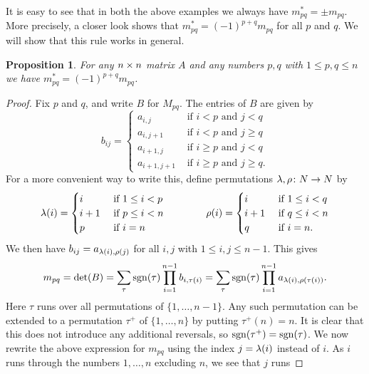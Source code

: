 \documentclass[reqno]{amsart}
\newtheorem{proposition}[theorem]{Proposition}
\theoremstyle{definition}
\begin{document}
It is easy to see that in both the above examples we always have
$m^*_{pq}=\pm m_{pq}$.  More precisely, a closer look shows that
$m^*_{pq}=(-1)^{p+q}m_{pq}$ for all $p$ and $q$.  We will show that
this rule works in general.

\begin{proposition}\label{prop-minors}
 For any $n\times n$ matrix $A$ and any numbers $p,q$ with
 $1\leq p,q\leq n$ we have $m^*_{pq}=(-1)^{p+q}m_{pq}$.
\end{proposition}
\begin{proof}
 Fix $p$ and $q$, and write $B$ for $M_{pq}$.  The entries of
 $B$ are given by
 \[ b_{ij} =
     \begin{cases}
      a_{i,j}     & \text{ if } i<p \text{ and } j < q \\
      a_{i,j+1}   & \text{ if } i<p \text{ and } j \geq q \\
      a_{i+1,j}   & \text{ if } i\geq p \text{ and } j < q \\
      a_{i+1,j+1} & \text{ if } i\geq p \text{ and } j \geq q.
     \end{cases}
 \]
 For a more convenient way to write this, define permutations
 $\lambda,\rho\colon N\to N$ by
 \[ \lambda(i) = \begin{cases}
      i   & \text{ if } 1\leq i<p \\
      i+1 & \text{ if } p\leq i<n \\
      p   & \text{ if } i=n
     \end{cases}
     \hspace{4em}
    \rho(i) = \begin{cases}
      i   & \text{ if } 1\leq i<q \\
      i+1 & \text{ if } q\leq i<n \\
      q   & \text{ if } i=n.
     \end{cases}
 \]
 We then have $b_{ij}=a_{\lambda(i),\rho(j)}$ for all $i,j$ with
 $1\leq i,j\leq n-1$.  This gives
 \[ m_{pq} = \det(B)
     = \sum_\tau \operatorname{sgn}(\tau)\prod_{i=1}^{n-1}b_{i,\tau(i)}
     = \sum_\tau \operatorname{sgn}(\tau)\prod_{i=1}^{n-1}a_{\lambda(i),\rho(\tau(i))}.
 \]
 Here $\tau$ runs over all permutations of $\{1,\dotsc,n-1\}$.  Any
 such permutation can be extended to a permutation $\tau^+$ of
 $\{1,\dotsc,n\}$ by putting $\tau^+(n)=n$.  It is clear that this
 does not introduce any additional reversals, so
 $\operatorname{sgn}(\tau^+)=\operatorname{sgn}(\tau)$.  We now rewrite the above expression for
 $m_{pq}$ using the index $j=\lambda(i)$ instead of $i$.  As $i$ runs
 through the numbers $1,\dotsc,n$ excluding $n$, we see that $j$ runs

\end{proof}
\end{document}
